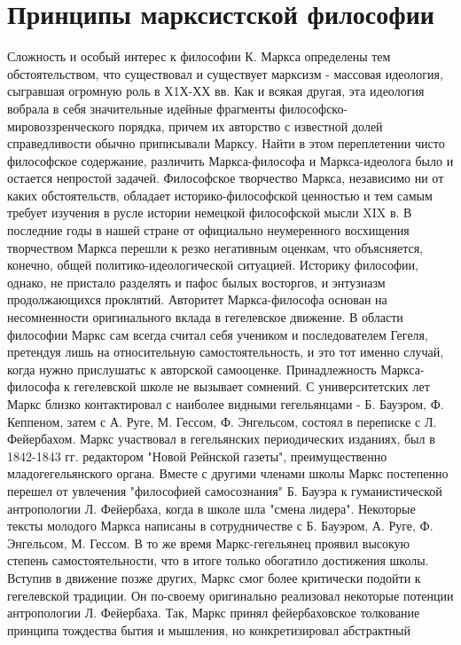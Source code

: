 \documentclass[12pt]{article}
\begin{document}
\section{Принципы марксистской философии}
Сложность и особый интерес к философии К. Маркса определены тем обстоятельством, что существовал и
существует марксизм - массовая идеология, сыгравшая огромную роль в Х1Х-ХХ вв. Как и всякая другая, эта
идеология вобрала в себя значительные идейные фрагменты философско-мировоззренческого порядка, причем
их авторство с известной долей справедливости обычно приписывали Марксу. Найти в этом переплетении чисто
философское содержание, различить Маркса-философа и Маркса-идеолога было и остается непростой задачей.
Философское  творчество  Маркса,  независимо  ни  от  каких  обстоятельств,  обладает  историко-философской
ценностью и тем самым требует изучения в русле истории немецкой философской мысли XIX в.
В последние годы в нашей стране от официально неумеренного восхищения творчеством Маркса перешли к
резко негативным оценкам, что объясняется, конечно, общей политико-идеологической ситуацией. Историку
философии, однако, не пристало разделять и пафос былых восторгов, и энтузиазм продолжающихся проклятий.
Авторитет  Маркса-философа  основан  на  несомненности  оригинального  вклада  в  гегелевское  движение.  В
области философии Маркс сам всегда считал себя учеником и последователем Гегеля, претендуя лишь на
относительную самостоятельность, и это тот именно случай, когда нужно прислушатьс к авторской самооценке.
Принадлежность Маркса-философа к гегелевской школе не вызывает сомнений. С университетских лет Маркс
близко контактировал с наиболее видными гегельянцами - Б. Бауэром, Ф. Кеппеном, затем с А. Руге, М. Гессом,
Ф. Энгельсом, состоял в переписке с Л. Фейербахом.
Маркс участвовал в гегельянских периодических изданиях, был в 1842-1843 гг. редактором "Новой Рейнской
газеты", преимущественно младогегельянского органа. Вместе с другими членами школы Маркс постепенно
перешел от увлечения "философией самосознания" Б. Бауэра к гуманистической антропологии Л. Фейербаха,
когда в школе шла "смена лидера".
Некоторые тексты молодого Маркса написаны в сотрудничестве с Б. Бауэром, А. Руге, Ф. Энгельсом, М. Гессом.
В то же время Маркс-гегельянец проявил высокую степень самостоятельности, что в итоге только обогатило
достижения школы. Вступив в движение позже других, Маркс смог более критически подойти к гегелевской
традиции.
Он по-своему оригинально реализовал некоторые потенции антропологии Л. Фейербаха. Так, Маркс принял
фейербаховское  толкование  принципа  тождества  бытия  и  мышления,  но  конкретизировал  абстрактный
\end{document}
